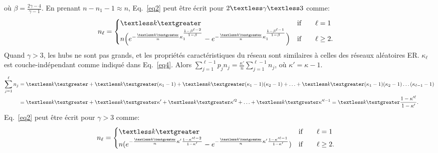 où $\beta=\frac{2\gamma-4}{\gamma-1}$. En prenant $n-n_1-1 \approx n$, Eq.~\eqref{eq2} peut être écrit pour $2\textless \gamma \textless 3$ comme:
\begin{align}
n_{\ell} &=
\begin{cases}
\km & \text{if}\qquad \ell=1 \\
n\Big(e^{-\frac{\km}{n}\kappa_1^{\frac{1-\beta^{\ell-2}}{1-\beta}}}-e^{-\frac{\km}{n}\kappa_1^{\frac{1-\beta^{\ell-1}}{1-\beta}}}\Big) & \text{if}\qquad \ell \ge 2.
\end{cases}
\label{eq8}
\end{align}
Quand $\gamma> 3 $, les hubs ne sont pas grands, et les propriétés caractéristiques du réseau sont similaires à celles des réseaux aléatoires ER.
 $\kappa_{\ell}$ est couche-indépendant comme indiqué dans Eq.~\eqref{eq4}.
Alors $\sum_{j=1}^{\ell-1}p_j n_j=\frac{\kappa'}{n}\sum_{j=1}^{\ell-1}n_j$, où $\kappa'=\kappa-1$.  
\begin{align}
\sum_{j=1}^{\ell}n_j &=\km+\km(\kappa_1-1)+\km(\kappa_1-1)(\kappa_2-1)+\ldots+\km(\kappa_1-1)(\kappa_2-1)\ldots(\kappa_{\ell-1}-1) \nonumber\\
&=\km+\km\kappa'+\km\kappa'^2+\ldots+\km\kappa'^{\ell-1}=\km\frac{1-\kappa'^{\ell}}{1-\kappa'}. 
\label{eq9}
\end{align}
Eq.~\eqref{eq2} peut être écrit pour $\gamma>3$ comme:
\begin{align}
n_{\ell} &=
\begin{cases}
\textless k \textgreater & \text{if}\qquad \ell=1 \\
n(e^{-\frac{\textless k \textgreater}{n}\kappa'\frac{1-\kappa'^{\ell-2}}{1-\kappa'}}-e^{-\frac{\km}{n}\kappa'\frac{1-\kappa'^{\ell-1}}{1-\kappa'}}) & \text{if}\qquad \ell \ge 2.
\end{cases}
\label{eq10}
\end{align}
